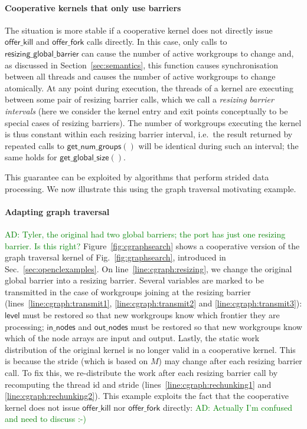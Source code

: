 \documentclass[numbers,nocopyrightspace,10pt]{sigplanconf}
\newcommand{\ADComment}[1]{\textcolor{green}{AD: #1}}
\newcommand{\myfig}{Fig.~}
\newcommand{\myfiglong}{Figure~}
\newcommand{\mysec}{Sec.~}
\newcommand{\offerfork}{\mathsf{offer\_fork}}
\newcommand{\offerkill}{\mathsf{offer\_kill}}
\newcommand{\resizingglobalbarrier}{\mathsf{resizing\_global\_barrier}}
\newcommand{\getnumgroups}{\mathsf{get\_num\_groups}}
\newcommand{\getglobalsize}{\mathsf{get\_global\_size}}
\newcommand{\keyword}[1]{\mathsf{#1}}
\begin{document}
\paragraph{Cooperative kernels that only use barriers}

The situation is more stable if a cooperative kernel does not directly
issue $\offerkill$ and $\offerfork$ calls directly.  In this case,
only calls to $\resizingglobalbarrier$ can cause the number of active
workgroups to change and, as discussed in Section~\ref{sec:semantics},
this function causes synchronisation between all threads and causes
the number of active workgroups to change atomically.  At any point
during execution, the threads of a kernel are executing between some
pair of resizing barrier calls, which we call a \emph{resizing barrier
  intervals} (here we consider the kernel entry and exit points
conceptually to be special cases of resizing barriers).  The number of
workgroups executing the kernel is thus constant within each resizing
barrier interval, i.e.\ the result returned by repeated calls to
$\getnumgroups()$ will be identical during such an interval; the same holds for $\getglobalsize()$.

This guarantee can be exploited by algorithms that perform strided
data processing.  We now illustrate this using the graph traversal motivating example.

\paragraph{Adapting graph traversal} \ADComment{Tyler, the original had two global barriers; the port has just one resizing barrier.  Is this right?}
\myfiglong\ref{fig:cgraphsearch} shows a cooperative version of the graph traversal kernel
of \myfig\ref{fig:graphsearch}, introduced in
\mysec\ref{sec:openclexamples}.  
On line~\ref{line:cgraph:resizing}, we change the original global barrier
into a resizing barrier. Several variables are marked to be
transmitted in the case of workgroups joining at the resizing barrier
(lines~\ref{line:cgraph:transmit1}, \ref{line:cgraph:transmit2} and
\ref{line:cgraph:transmit3}): $\keyword{level}$ must be restored so that
new workgroups know which frontier they are processing; $\keyword{in\_nodes}$ and $\keyword{out\_nodes}$ must be restored so that new
workgroups know which of the node arrays are input and output. Lastly,
the static work distribution of the original kernel is no longer valid
in a cooperative kernel. This is because the stride (which is based on
$M$) may change after each resizing barrier
call. To fix this, we re-distribute the work after each resizing
barrier call by recomputing the thread id and stride
(lines~\ref{line:cgraph:rechunking1} and
\ref{line:cgraph:rechunking2}).  This example exploits the fact that the cooperative kernel does not issue $\offerkill$ nor $\offerfork$ directly: \ADComment{Actually I'm confused and need to discuss :-)}
\end{document}
